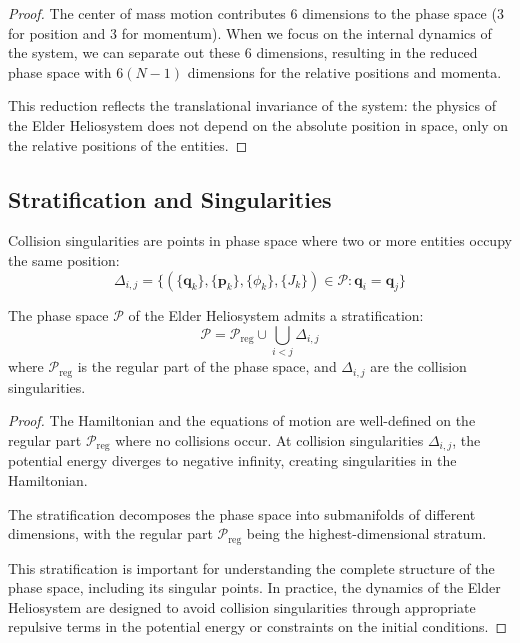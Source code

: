 \begin{proof}
The center of mass motion contributes 6 dimensions to the phase space (3 for position and 3 for momentum). When we focus on the internal dynamics of the system, we can separate out these 6 dimensions, resulting in the reduced phase space with $6(N-1)$ dimensions for the relative positions and momenta.

This reduction reflects the translational invariance of the system: the physics of the Elder Heliosystem does not depend on the absolute position in space, only on the relative positions of the entities.
\end{proof}

\subsection{Stratification and Singularities}

\begin{definition}
Collision singularities are points in phase space where two or more entities occupy the same position:
\begin{equation}
\Delta_{i,j} = \{(\{\mathbf{q}_k\}, \{\mathbf{p}_k\}, \{\phi_k\}, \{J_k\}) \in \mathcal{P} : \mathbf{q}_i = \mathbf{q}_j\}
\end{equation}
\end{definition}

\begin{theorem}
The phase space $\mathcal{P}$ of the Elder Heliosystem admits a stratification:
\begin{equation}
\mathcal{P} = \mathcal{P}_{\text{reg}} \cup \bigcup_{i < j} \Delta_{i,j}
\end{equation}
where $\mathcal{P}_{\text{reg}}$ is the regular part of the phase space, and $\Delta_{i,j}$ are the collision singularities.
\end{theorem}

\begin{proof}
The Hamiltonian and the equations of motion are well-defined on the regular part $\mathcal{P}_{\text{reg}}$ where no collisions occur. At collision singularities $\Delta_{i,j}$, the potential energy diverges to negative infinity, creating singularities in the Hamiltonian.

The stratification decomposes the phase space into submanifolds of different dimensions, with the regular part $\mathcal{P}_{\text{reg}}$ being the highest-dimensional stratum.

This stratification is important for understanding the complete structure of the phase space, including its singular points. In practice, the dynamics of the Elder Heliosystem are designed to avoid collision singularities through appropriate repulsive terms in the potential energy or constraints on the initial conditions.
\end{proof}


